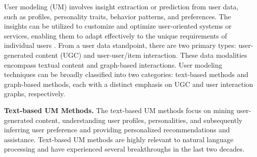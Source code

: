 \documentclass[11pt]{article}
\renewcommand\paragraph[1]{\vspace{0.05in} \noindent \textbf{#1.}}
\begin{document}

User modeling (UM) involves insight extraction or prediction from user data, such as profiles, personality traits, behavior patterns, and preferences. The insights can be utilized to customize and optimize user-oriented systems or services, enabling them to adapt effectively to the unique requirements of individual users \cite{li2021survey}.
From a user data standpoint, there are two primary types: user-generated content (UGC) and user-user/item interaction. These data modalities encompass textual content and graph-based interactions. User modeling techniques can be broadly classified into two categories: text-based methods and graph-based methods, each with a distinct emphasis on UGC and user interaction graphs, respectively.



\paragraph{Text-based UM Methods} The text-based UM methods focus on mining user-generated content, understanding user profiles, personalities, and subsequently inferring user preference and providing personalized recommendations and assistance. Text-based UM methods are highly relevant to natural language processing and have experienced several breakthroughs in the last two decades. 
\end{document}
